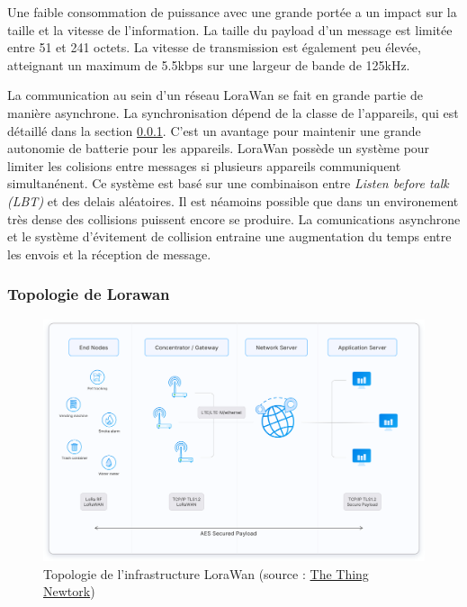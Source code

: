Une faible consommation de puissance avec une grande portée a un impact sur la taille et la vitesse de l'information. La taille du payload d'un message est limitée entre 51 et 241 octets. La vitesse de transmission est également peu élevée, atteignant un maximum de 5.5kbps sur une largeur de bande de 125kHz.

\vspace{0.1cm}

La communication au sein d'un réseau LoraWan se fait en grande partie de manière asynchrone. La synchronisation dépend de la classe de l'appareils, qui est détaillé dans la section \ref{topolora}. C'est un avantage pour maintenir une grande autonomie de batterie pour les appareils. LoraWan possède un système pour limiter les colisions entre messages si plusieurs appareils communiquent simultanénent. Ce système est basé sur une combinaison entre \textit{Listen before talk (LBT)} et des delais aléatoires\cite{loracolision}. Il est néamoins possible que dans un environement très dense des collisions puissent encore se produire. La comunications asynchrone et le système d'évitement de collision entraine une augmentation du temps entre les envois et la réception de message.

\subsubsection{Topologie de Lorawan}\label{topolora}

\begin{figure}[h]
\centering

\includegraphics[scale=0.1]{images/architecture.png}
\caption{Topologie de l'infrastructure LoraWan (source : \href{https://www.thethingsnetwork.org/docs/lorawan/architecture/}{The Thing Newtork})}\label{term7}
\end{figure}

